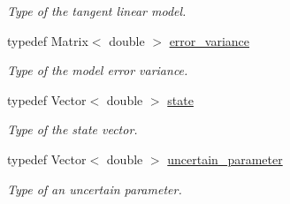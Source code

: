 \documentclass{tufte-book}
\begin{document}
\begin{DoxyCompactItemize}
\begin{DoxyCompactList}\small\item\em \-Type of the tangent linear model. \end{DoxyCompactList}\item
\hypertarget{class_verdandi_1_1_model_template_a79f36f136ce2c12e7fcb9e476af57d8c}{
typedef \-Matrix$<$ double $>$ \hyperlink{class_verdandi_1_1_model_template_a79f36f136ce2c12e7fcb9e476af57d8c}{error\-\_\-variance}}
\label{class_verdandi_1_1_model_template_a79f36f136ce2c12e7fcb9e476af57d8c}

\begin{DoxyCompactList}\small\item\em \-Type of the model error variance. \end{DoxyCompactList}\item
\hypertarget{class_verdandi_1_1_model_template_a6bb9efb7898f067bb21780159b497ba7}{
typedef \-Vector$<$ double $>$ \hyperlink{class_verdandi_1_1_model_template_a6bb9efb7898f067bb21780159b497ba7}{state}}
\label{class_verdandi_1_1_model_template_a6bb9efb7898f067bb21780159b497ba7}

\begin{DoxyCompactList}\small\item\em \-Type of the state vector. \end{DoxyCompactList}\item
\hypertarget{class_verdandi_1_1_model_template_ac387d42c1587d4a9c9b15682de1a5741}{
typedef \-Vector$<$ double $>$ \hyperlink{class_verdandi_1_1_model_template_ac387d42c1587d4a9c9b15682de1a5741}{uncertain\-\_\-parameter}}
\label{class_verdandi_1_1_model_template_ac387d42c1587d4a9c9b15682de1a5741}

\begin{DoxyCompactList}\small\item\em \-Type of an uncertain parameter. \end{DoxyCompactList}\end{DoxyCompactItemize}
\end{document}
